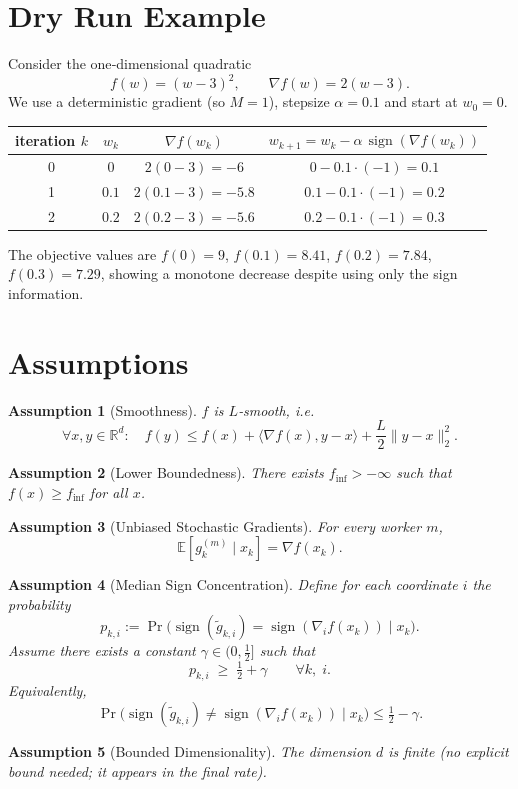 \documentclass{article}
\newtheorem{assumption}{Assumption}
\newcommand{\sign}{\operatorname{sign}}
\newcommand{\E}{\mathbb{E}}
\newcommand{\R}{\mathbb{R}}
\begin{document}
\section*{Dry Run Example}
Consider the one‑dimensional quadratic
\[
f(w)=(w-3)^2,\qquad \nabla f(w)=2(w-3).
\]
We use a deterministic gradient (so $M=1$), stepsize $\alpha=0.1$ and start at $w_0=0$.
\begin{center}
\begin{tabular}{c|c|c|c}
iteration $k$ & $w_k$ & $\nabla f(w_k)$ & $w_{k+1}=w_k-\alpha\,\sign(\nabla f(w_k))$ \\\hline
0 & $0$ & $2(0-3)=-6$ & $0-0.1\cdot(-1)=0.1$\\
1 & $0.1$ & $2(0.1-3)=-5.8$ & $0.1-0.1\cdot(-1)=0.2$\\
2 & $0.2$ & $2(0.2-3)=-5.6$ & $0.2-0.1\cdot(-1)=0.3$\\
\end{tabular}
\end{center}
The objective values are $f(0)=9$, $f(0.1)=8.41$, $f(0.2)=7.84$, $f(0.3)=7.29$,
showing a monotone decrease despite using only the sign information.

\newpage
\section*{Assumptions}
\begin{assumption}[Smoothness]
\label{ass:smooth}
$f$ is $L$‑smooth, i.e.
\[
\forall x,y\in\R^{d}:\quad 
f(y)\le f(x)+\langle\nabla f(x),y-x\rangle+\frac{L}{2}\|y-x\|_2^{2}.
\]
\end{assumption}
\begin{assumption}[Lower Boundedness]
\label{ass:lower}
There exists $f_{\inf}>-\infty$ such that $f(x)\ge f_{\inf}$ for all $x$.
\end{assumption}
\begin{assumption}[Unbiased Stochastic Gradients]
\label{ass:unbiased}
For every worker $m$,
\[
\E\!\left[g_k^{(m)}\mid x_k\right]=\nabla f(x_k).
\]
\end{assumption}
\begin{assumption}[Median Sign Concentration]
\label{ass:median}
Define for each coordinate $i$ the probability
\[
p_{k,i}:=\Pr\!\bigl(\sign(\tilde g_{k,i})=\sign(\nabla_i f(x_k))\mid x_k\bigr).
\]
Assume there exists a constant $\gamma\in(0,\tfrac12]$ such that
\[
p_{k,i}\;\ge\;\tfrac12+\gamma\qquad\forall k,\;i.
\tag{A4}
\]
Equivalently,
\[
\Pr\!\bigl(\sign(\tilde g_{k,i})\neq\sign(\nabla_i f(x_k))\mid x_k\bigr)\le\tfrac12-\gamma.
\]
\end{assumption}
\begin{assumption}[Bounded Dimensionality]
\label{ass:dim}
The dimension $d$ is finite (no explicit bound needed; it appears in the final rate).
\end{assumption}
\end{document}
